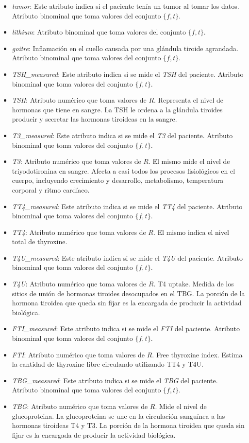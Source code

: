 \documentclass[osajnl,twocolumn,showpacs,superscriptaddress,10pt,floatfix]{revtex4-1} %
\begin{document}
\begin{itemize}
    \item \textit{tumor}: Este atributo indica si el paciente tenía un tumor al tomar los datos. Atributo binominal que toma valores del conjunto $\{f, t\}$.
    \item \textit{lithium}: Atributo binominal que toma valores del conjunto $\{f, t\}$.
    \item \textit{goitre}: Inflamación en el cuello causada por una glándula tiroide agrandada. Atributo binominal que toma valores del conjunto $\{f, t\}$.
    \item \textit{TSH\_measured}: Este atributo indica si se mide el \textit{TSH} del paciente. Atributo binominal que toma valores del conjunto $\{f, t\}$.
    \item \textit{TSH}: Atributo numérico que toma valores de $R$. Representa el nivel de hormonas que tiene en sangre. La TSH le ordena a la glándula tiroides producir y secretar las hormonas tiroideas en la sangre.
    \item \textit{T3\_measured}: Este atributo indica si se mide el \textit{T3} del paciente. Atributo binominal que toma valores del conjunto $\{f, t\}$.
    \item \textit{T3}: Atributo numérico que toma valores de $R$. El mismo mide el nivel de triyodotironina en sangre. Afecta a casi todos los procesos fisiológicos en el cuerpo, incluyendo crecimiento y desarrollo, metabolismo, temperatura corporal y ritmo cardíaco. 
    \item \textit{TT4\_measured}: Este atributo indica si se mide el \textit{TT4} del paciente. Atributo binominal que toma valores del conjunto $\{f, t\}$.
    \item \textit{TT4}: Atributo numérico que toma valores de $R$. El mismo indica el nivel total de thyroxine.
    \item \textit{T4U\_measured}: Este atributo indica si se mide el \textit{T4U} del paciente. Atributo binominal que toma valores del conjunto $\{f, t\}$.
    \item \textit{T4U}: Atributo numérico que toma valores de $R$. T4 uptake. Medida de los sitios de unión de hormonas tiroides desocupados en el TBG. La porción de la hormona tiroidea que queda sin fijar es la encargada de producir la actividad biológica.
    \item \textit{FTI\_measured}: Este atributo indica si se mide el \textit{FTI} del paciente. Atributo binominal que toma valores del conjunto $\{f, t\}$.
    \item \textit{FTI}: Atributo numérico que toma valores de $R$. Free thyroxine index. Estima la cantidad de thyroxine libre circulando utilizando TT4 y T4U.
    \item \textit{TBG\_measured}: Este atributo indica si se mide el \textit{TBG} del paciente. Atributo binominal que toma valores del conjunto $\{f, t\}$.
    \item \textit{TBG}: Atributo numérico que toma valores de $R$. Mide el nivel de glucoproteina. La glucoproteina se une en la circulación sanguínea a las hormonas tiroideas T4 y T3. La porción de la hormona tiroidea que queda sin fijar es la encargada de producir la actividad biológica. 
\end{itemize}
\end{document}
